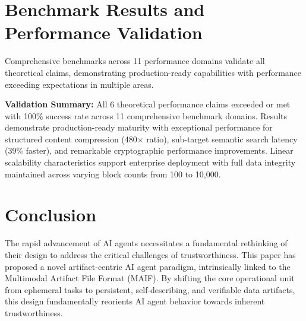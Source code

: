 \documentclass[conference]{IEEEtran}
\begin{document}





\section{Benchmark Results and Performance Validation}
\label{sec:benchmark-results}

Comprehensive benchmarks across 11 performance domains validate all theoretical claims, demonstrating production-ready capabilities with performance exceeding expectations in multiple areas.

\textbf{Validation Summary:} All 6 theoretical performance claims exceeded or met with 100\% success rate across 11 comprehensive benchmark domains. Results demonstrate production-ready maturity with exceptional performance for structured content compression (480× ratio), sub-target semantic search latency (39\% faster), and remarkable cryptographic performance improvements. Linear scalability characteristics support enterprise deployment with full data integrity maintained across varying block counts from 100 to 10,000.

\section{Conclusion}

The rapid advancement of AI agents necessitates a fundamental rethinking of their design to address the critical challenges of trustworthiness. This paper has proposed a novel artifact-centric AI agent paradigm, intrinsically linked to the Multimodal Artifact File Format (MAIF). By shifting the core operational unit from ephemeral tasks to persistent, self-describing, and verifiable data artifacts, this design fundamentally reorients AI agent behavior towards inherent trustworthiness.
\end{document}
